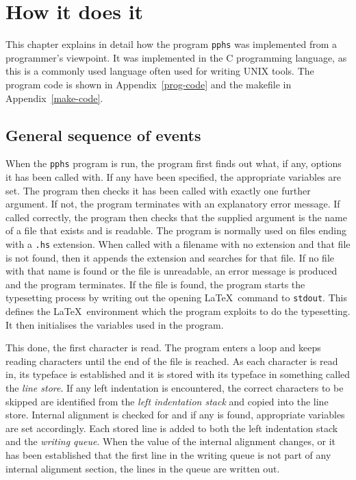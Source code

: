 \chapter{How it does it}

This chapter explains in detail how the program {\tt pphs} was implemented
from a programmer's viewpoint.  It was implemented in the C programming
language, as this is a commonly used language often used for writing UNIX tools.
The program code is shown in Appendix~\ref{prog-code} and the makefile in
Appendix~\ref{make-code}.

\section{General sequence of events}

When the {\tt pphs} program is run, the program first finds out what, if any,
options it has been called with.  If any have been specified, the appropriate
variables are set.  The program then checks it has been called with exactly one
further argument.  If not, the program terminates with an
explanatory error message.  If called correctly, the program then checks that the
supplied argument is the name of a file that exists and is readable.
The program is normally used
on files ending with a {\tt .hs} extension.  When called with a filename
with no extension and that file is not found, then it appends the extension and searches
for that file.  If no file with that name is found or the file is unreadable, an
error message is produced and the program terminates.  If the file is found, the
program starts the typesetting process by writing out the opening
\LaTeX\ command to {\tt stdout}.
This defines the \LaTeX\ environment which the program exploits to do the typesetting.
It then initialises the variables used in the program.

This done, the first character is read.  The program enters a loop and keeps
reading characters until the end of the file is reached.  As each character is read
in, its typeface is established and it is stored with its typeface in something
called the {\em line store\/}.  If any left indentation is
encountered, the correct characters to be skipped are identified from the {\em left
indentation stack} and copied into the line store.  Internal alignment is checked
for and if any is found, appropriate variables are set accordingly.  Each stored line is
added to both the left indentation stack and the {\em writing queue}.  When the value of the
internal alignment changes, or it has been established that the first line in the writing
queue is not part of any internal alignment section, the lines in the queue are written out.

